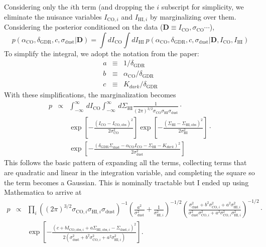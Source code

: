 \documentclass[12pt,preprint]{aastex}
\begin{document}
Considering only the $i$th term (and dropping the $i$ subscript for simplicity, we eliminate the nuisance variables $I_{\mathrm{CO},i}$ and $I_{\mathrm{HI},i}$ by marginalizing over them.  Considering the posterior conditioned on the data  ($\mathbf{D}\equiv I_{\mathrm{CO}},\sigma_{\mathrm{CO}}\cdots$),
\[
p(\alpha_{\mathrm{CO}},\delta_{\mathrm{GDR}},c,\sigma_{\mathrm{dust}}|\mathbf{D}) = \int d I_{\mathrm{CO}} \int d I_{\mathrm{HI}} ~ p(\alpha_{\mathrm{CO}},\delta_{\mathrm{GDR}},c,\sigma_{\mathrm{dust}}|\mathbf{D}, I_{\mathrm{CO}}, I_{\mathrm{HI}})
\]
To simplify the integral, we adopt the notation from the paper:
\begin{eqnarray*}
a & \equiv & 1/\delta_{\mathrm{GDR}}\\
b & \equiv & \alpha_{\mathrm{CO}}/\delta_{\mathrm{GDR}}\\
c & \equiv & K_{dark}/\delta_{\mathrm{GDR}}
\end{eqnarray*}
With these simplifications, the marginalization becomes
\begin{eqnarray*}
p &\propto& \int_{-\infty}^{\infty}\, dI_{\mathrm{CO}}
\int_{-\infty}^{\infty}\, d\Sigma_{\mathrm{HI}} \frac{1}{(2\pi)^{3/2}
\sigma_{\mathrm{CO}}\sigma_{\mathrm{HI}}\sigma_{\mathrm{dust}}} \cdot\\
&&
\exp\left[-\frac{(I_{\mathrm{CO}}-I_{\mathrm{CO,obs}})^2}
{2\sigma^2_{\mathrm{CO}}}\right]
\exp\left[-\frac{(\Sigma_{\mathrm{HI}}-\Sigma_{\mathrm{HI,obs}})^2}
{2\sigma^2_{\mathrm{HI}}}\right]\cdot \\
&& \exp\left[-\frac{(\delta_{\mathrm{GDR}}\Sigma_{\mathrm{dust}}- \alpha_{\mathrm{CO}} I_{\mathrm{CO}}-\Sigma_{\mathrm{HI}}-K_{dark})^2}{2\sigma_{\mathrm{dust}}^2}\right]
\end{eqnarray*}
This follows the basic pattern of expanding all the terms, collecting
terms that are quadratic and linear in the integration variable, and
completing the square so the term becomes a Gaussian.  This is nominally tractable but I ended up using Mathematica to arrive at
\begin{eqnarray*}
p &\propto& \prod_i  \left((2\pi)^{3/2}
\sigma_{\mathrm{CO},i}\sigma_{\mathrm{HI},i}\sigma_{\mathrm{dust}}\right)^{-1}
\left(\frac{a^2}{\sigma^2_{\mathrm{dust}}}+\frac{1}{\sigma^2_{\mathrm{HI},i}}\right)^{-1/2}
\left(\frac{\sigma^2_{\mathrm{dust}}+b^2\sigma^2_{\mathrm{CO},i}+a^2\sigma^2_{\mathrm{HI},i}}{\sigma^2_{\mathrm{dust}}\sigma^2_{\mathrm{CO},i}+a^2 \sigma^2_{\mathrm{CO},i}\sigma^2_{\mathrm{HI},i} }\right)^{-1/2}\cdot\\
&& \exp\left[-\frac{(c+bI_{\mathrm{CO,obs},i}+
a \Sigma_{\mathrm{HI,obs},i}-\Sigma_{\mathrm{dust},i})^2}{2(\sigma^2_{\mathrm{dust}}+b^2\sigma^2_{\mathrm{CO},i}+a^2\sigma^2_{\mathrm{HI},i})}\right].
\end{eqnarray*}
\end{document}
